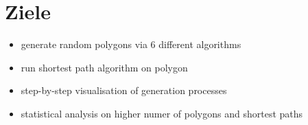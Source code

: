 \documentclass[10pt,a4paper,fleqn]{article}
\begin{document}
  \renewcommand{\labelenumi}{(\alph{enumi})}
  \renewcommand\headrule{\vspace{+2pt}\hrule}
  \newcommand{\solved}{\[\hfill\Box\]}
  \newcommand{\ableitung}{\mapsto}
  \setlength{\headheight}{2.5\baselineskip}
  \pagestyle{fancyplain}

  
  \section*{Ziele}
    
    \begin{itemize}
    
	    \item generate random polygons via 6 different algorithms
	    \item run shortest path algorithm on polygon
	    \item step-by-step visualisation of generation processes
	    \item statistical analysis on higher numer of polygons and shortest paths
	   
	   \end{itemize}
    
\end{document}
